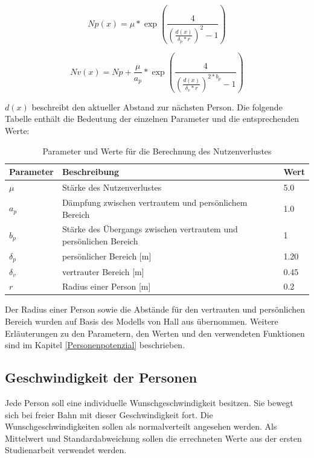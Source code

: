 \begin{equation}
\label{Equ:NutzenverlustP}
Np(x)= \mu * \exp(\frac{4}{(\frac{d(x)}{\delta_p * r})^{2} -1}) 
\end{equation}

\begin{equation}
\label{Equ:NutzenverlustV}
Nv(x)= Np + \frac{\mu}{a_p} * \exp(\frac{4}{(\frac{d(x)}{\delta_v * r})^{2*b_p} -1}) 
\end{equation}

$d(x)$ beschreibt den aktueller Abstand zur nächsten Person. Die folgende Tabelle enthält die Bedeutung der einzelnen Parameter und die entsprechenden Werte: 

\begin{table}[htpb]
	\centering
	\begin{tabular}{lll}
		Parameter & Beschreibung  &  Wert\\ \hline
		$\mu$ & Stärke des Nutzenverlustes & 5.0 \\
		$a_p$ & Dämpfung zwischen vertrautem und persönlichem Bereich & 1.0 \\
		$b_p$ & Stärke des Übergangs zwischen vertrautem und persönlichen Bereich &1 \\
		$\delta_p$ & persönlicher Bereich [m]& 1.20 \\
		$\delta_v$ & vertrauter Bereich [m]& 0.45 \\
		$r$ & Radius einer Person [m] & 0.2  
	\end{tabular}
	\caption{Parameter und Werte für die Berechnung des Nutzenverlustes}
	\label{tab:parameterNutzenverlust}
\end{table}

Der Radius einer Person sowie die Abstände für den vertrauten und persönlichen Bereich wurden auf Basis des Modells von Hall aus \cite{VONSIVERS2015104} übernommen. Weitere Erläuterungen zu den Parametern, den Werten und den verwendeten Funktionen sind im Kapitel \ref{Personenpotenzial} beschrieben.
 
\subsection{Geschwindigkeit der Personen}
Jede Person soll eine individuelle Wunschgeschwindigkeit besitzen. Sie bewegt sich bei freier Bahn mit dieser Geschwindigkeit fort. Die Wunschgeschwindigkeiten sollen als normalverteilt angesehen werden. Als Mittelwert und Standardabweichung sollen die errechneten Werte aus der ersten Studienarbeit verwendet werden.

